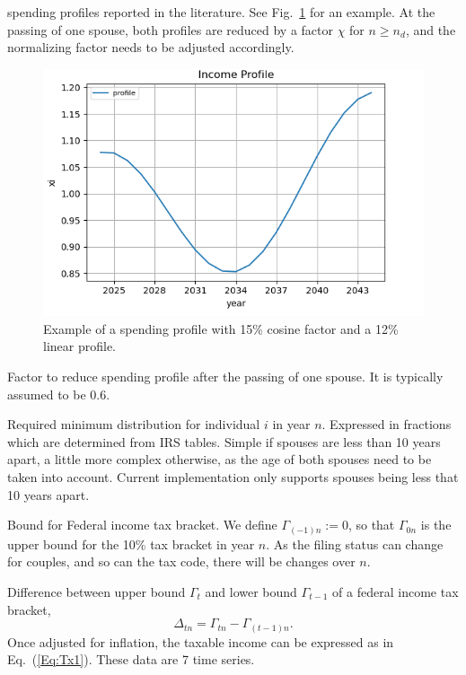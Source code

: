\documentclass{report}[fleqn,12pt]
\begin{document}
\begin{description}[leftmargin=4em,style=multiline]
		spending profiles reported in the literature. See Fig.~\ref{Fig:profile} for an example.
	At the passing of one spouse, both profiles are reduced by a factor $\chi$ for $n \ge n_d$,
	and the normalizing factor needs to be adjusted accordingly.
		\begin{figure}[t]
		\includegraphics{profile.png}
		\caption{\small Example of a spending profile with 15\% cosine factor and a 12\% linear
		profile. \label{Fig:profile}}
		\end{figure}
\item [$\chi$]
	Factor to reduce spending profile after the passing of one spouse. It is typically
	assumed to be 0.6.
\item [$\rho_{in}$]
	Required minimum distribution for individual $i$ in year $n$. Expressed in fractions
	which are determined from IRS tables. Simple if spouses are less than 10 years apart,
	a little more complex otherwise, as the age of both spouses need to be taken into account.
	Current implementation only supports spouses being less that 10 years apart.
\item [$\Gamma_{tn}$]
	Bound for Federal income tax bracket. We define $\Gamma_{(-1)n} := 0$, so that
	$\Gamma_{0n}$ is the upper bound for the 10\% tax bracket in year $n$. As the filing status
	can change for couples, and so can the tax code, there will be changes over $n$.
\item [$\Delta_{tn}$]
	Difference between upper bound $\Gamma_t$ and lower bound $\Gamma_{t-1}$
	of a federal income tax bracket,
	\begin{equation}
		\Delta_{tn} = \Gamma_{tn} - \Gamma_{(t-1)n}.
	\end{equation}
	Once adjusted for inflation,
	the taxable income can be expressed as in Eq.~(\ref{Eq:Tx1}). These data are 7 time series.

\end{description}
\end{document}
